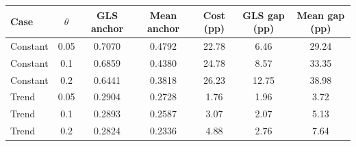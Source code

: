\begin{tabular}{lcccccc}
\toprule
Case & $\theta$ & GLS anchor & Mean anchor & Cost (pp) & GLS gap (pp) & Mean gap (pp) \\
\midrule
Constant & 0.05 & 0.7070 & 0.4792 & 22.78 & 6.46 & 29.24 \\
Constant & 0.1 & 0.6859 & 0.4380 & 24.78 & 8.57 & 33.35 \\
Constant & 0.2 & 0.6441 & 0.3818 & 26.23 & 12.75 & 38.98 \\
\addlinespace
Trend & 0.05 & 0.2904 & 0.2728 & 1.76 & 1.96 & 3.72 \\
Trend & 0.1 & 0.2893 & 0.2587 & 3.07 & 2.07 & 5.13 \\
Trend & 0.2 & 0.2824 & 0.2336 & 4.88 & 2.76 & 7.64 \\
\bottomrule
\end{tabular}
